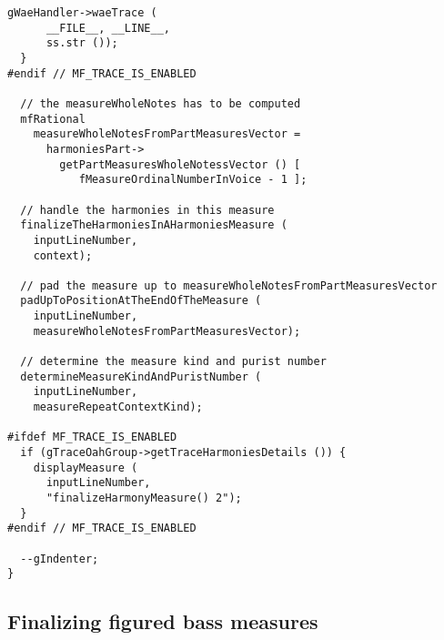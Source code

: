 \begin{lstlisting}[language=CPlusPlus]
    gWaeHandler->waeTrace (
      __FILE__, __LINE__,
      ss.str ());
  }
#endif // MF_TRACE_IS_ENABLED

  // the measureWholeNotes has to be computed
  mfRational
    measureWholeNotesFromPartMeasuresVector =
      harmoniesPart->
        getPartMeasuresWholeNotessVector () [
           fMeasureOrdinalNumberInVoice - 1 ];

  // handle the harmonies in this measure
  finalizeTheHarmoniesInAHarmoniesMeasure (
    inputLineNumber,
    context);

  // pad the measure up to measureWholeNotesFromPartMeasuresVector
  padUpToPositionAtTheEndOfTheMeasure (
    inputLineNumber,
    measureWholeNotesFromPartMeasuresVector);

  // determine the measure kind and purist number
  determineMeasureKindAndPuristNumber (
    inputLineNumber,
    measureRepeatContextKind);

#ifdef MF_TRACE_IS_ENABLED
  if (gTraceOahGroup->getTraceHarmoniesDetails ()) {
    displayMeasure (
      inputLineNumber,
      "finalizeHarmonyMeasure() 2");
  }
#endif // MF_TRACE_IS_ENABLED

  --gIndenter;
}
\end{lstlisting}


\subsection{Finalizing figured bass measures}

